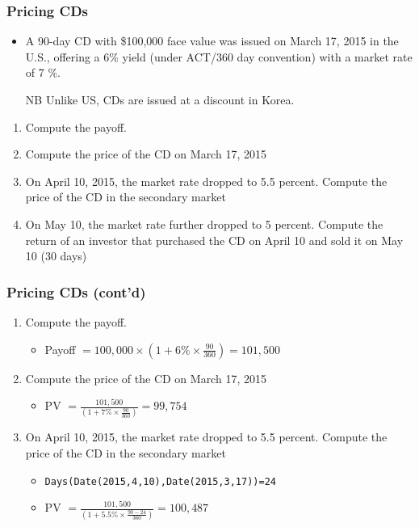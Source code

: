 \documentclass[10pt]{beamer}
\begin{document}
	\begin{frame}
		\frametitle{Pricing CDs}
		
		\begin{itemize}
			\item A 90-day CD with \$100,000 face value was issued on March 17, 2015 in the U.S., offering a 6\% yield (under ACT/360 day convention) with a market rate of 7 \%.
			
			\item[NB] Unlike US, CDs are issued at a discount in Korea.
			
		\end{itemize}		
		
		\begin{enumerate}
			\item Compute the payoff.
			\item Compute the price of the CD on March 17, 2015
			\item On April 10, 2015, the market rate dropped to 5.5 percent. Compute the price of the CD in the secondary market
			\item On May 10, the market rate further dropped to 5 percent. Compute the return of an investor that purchased the CD on April 10 and sold it on May 10 (30 days)
		\end{enumerate}
		
		
	\end{frame}
	
	
	
	
	\begin{frame}
		\frametitle{Pricing CDs (cont'd)}
		
		\begin{enumerate} \itemsep10pt
			
			\item Compute the payoff.
			\begin{itemize}
				\item Payoff $ = 100,000 \times \left(1+ 6\% \times \frac{90}{360} \right) = 101,500 $
			\end{itemize}
			
			\item Compute the price of the CD on March 17, 2015
			\begin{itemize}
				\item PV $ = \frac{101,500}{\left( 1+ 7\% \times \frac{90}{360} \right)}  = 99,754 $
			\end{itemize}
			
			\item On April 10, 2015, the market rate dropped to 5.5 percent. Compute the price of the CD in the secondary market
			\begin{itemize}
				\item \texttt{Days(Date(2015,4,10),Date(2015,3,17))=24} \vspace{5pt}
				\item PV $ = \frac{101,500}{\left( 1+ 5.5\% \times \frac{90-24}{360} \right)}  = 100,487 $
			\end{itemize}			
			
			
		\end{enumerate}
		
		
	\end{frame}
	
\end{document}
